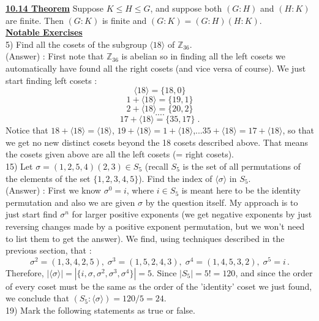 \documentclass[12pt, letterpaper]{article}
\begin{document}
\noindent \underline{\bf 10.14 Theorem} Suppose $K \leq H \leq G$, and suppose both $(G:H)$ and $(H:K)$ are finite. Then $(G:K)$ is finite and $(G:K) = (G:H)(H:K)$. \\

\noindent \underline{\bf Notable Exercises} \\

5) Find all the cosets of the subgroup $\langle 18 \rangle$ of $\mathbb{Z}_{36}$. \\

(Answer) : First note that $\mathbb{Z}_{36}$ is abelian so in finding all the left cosets we automatically have found all the right cosets (and vice versa of course). We just start finding left cosets : 
$$\langle 18 \rangle = \{18,0\}$$
$$1 + \langle 18 \rangle = \{19,1\}$$
$$2 + \langle 18 \rangle = \{20,2\}$$
$$....$$
$$17 + \langle 18 \rangle = \{35,17\} \;.$$
Notice that $18 + \langle 18 \rangle = \langle 18 \rangle$, $19 + \langle 18 \rangle = 1 + \langle 18 \rangle$,...$35 + \langle 18 \rangle = 17 + \langle 18 \rangle$, so that we get no new distinct cosets beyond the 18 cosets described above. That means the cosets given above are all the left cosets (= right cosets). \\

15) Let $\sigma = (1,2,5,4)(2,3) \in S_5$ (recall $S_5$ is the set of all permutations of the elements of the set $\{1,2,3,4,5\}$). Find the index of $\langle \sigma \rangle$ in $S_5$. \\

(Answer) : First we know $\sigma^0 = i$, where $i \in S_5$ is meant here to be the identity permutation and also we are given $\sigma$ by the question itself. My approach is to just start find $\sigma^n$ for larger positive exponents (we get negative exponents by just reversing changes made by a positive exponent permutation, but we won't need to list them to get the answer). We find, using techniques described in the previous section, that : $$\sigma^2 = (1,3,4,2,5),\; \sigma^3 = (1,5,2,4,3), \; \sigma^4 = (1,4,5,3,2), \;\sigma^5 = i\,.$$
Therefore, $|\langle \sigma \rangle | = |\{i,\sigma,\sigma^2,\sigma^3,\sigma^4\}| = 5$. Since $|S_5| = 5! = 120$, and since the order of every coset must be the same as the order of the 'identity' coset we just found, we conclude that $(S_5 : \langle \sigma \rangle) = 120 / 5 = 24$. \\

19) Mark the following statements as true or false. \\
\end{document}
